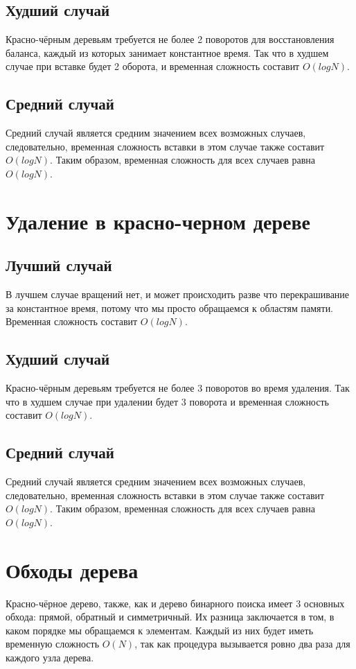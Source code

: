 \documentclass[otchet]{SCWorks}
\begin{document}
\subsection{Худший случай}
Красно-чёрным деревьям требуется не более 2 поворотов для восстановления баланса, каждый из которых занимает константное время. Так что в худшем случае при вставке будет 2 оборота, и временная сложность составит $O(logN)$.

\subsection{Средний случай}
Средний случай является средним значением всех возможных случаев, следовательно, временная сложность вставки в этом случае также составит $O(logN)$.
Таким образом, временная сложность для всех случаев равна $O(logN)$.

\section{Удаление в красно-черном дереве}
\subsection{Лучший случай}
В лучшем случае вращений нет, и может происходить разве что перекрашивание за константное время, потому что мы просто обращаемся к областям памяти. Временная сложность составит $O(logN)$.

\subsection{Худший случай}
Красно-чёрным деревьям требуется не более 3 поворотов во время удаления. Так что в худшем случае при удалении будет 3 поворота и временная сложность составит $O(log N)$.

\subsection{Средний случай}
Средний случай является средним значением всех возможных случаев, следовательно, временная сложность вставки в этом случае также составит $O(log N)$.
Таким образом, временная сложность для всех случаев равна $O(logN)$.

\section{Обходы дерева}
Красно-чёрное дерево, также, как и дерево бинарного поиска имеет 3 основных обхода: прямой, обратный и симметричный. Их разница заключается в том, в каком порядке мы обращаемся к элементам. Каждый из них будет иметь временную сложность $O(N)$, так как процедура вызывается ровно два раза для каждого узла дерева.
\end{document}
